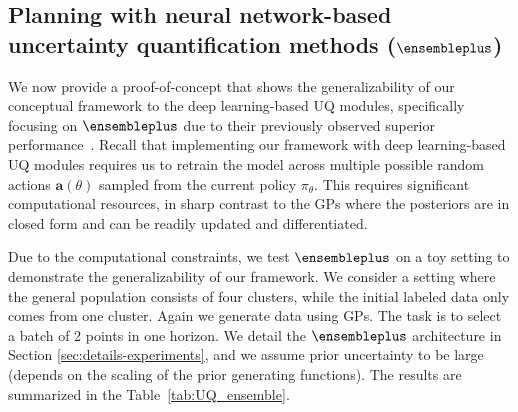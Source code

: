 





\subsection{Planning with  neural network-based uncertainty quantification methods ($\ensembleplus$)}


We now provide a proof-of-concept that shows the generalizability of our conceptual framework  to the deep learning-based UQ modules, specifically focusing on $\ensembleplus$ due to their previously observed superior performance~\citep{OsbandWenAsDwIbLuRo23}. Recall that implementing our framework with deep learning-based UQ modules  requires us to retrain the model across multiple possible random actions $\bm{a}(\theta)$ sampled from the current policy $\pi_\theta$.
This requires significant computational resources, in sharp contrast to the GPs where the posteriors are in closed form and can be readily updated and differentiated. 

Due to the computational constraints, we test $\ensembleplus$ on a toy setting to demonstrate the generalizability of our framework. We consider a setting where the general population consists of four clusters, while the initial labeled data only comes from one cluster. Again we generate data using GPs.  The task is to select a batch of 2 points in one horizon. We detail the $\ensembleplus$ architecture in Section \ref{sec:details-experiments}, and we assume prior uncertainty to be large (depends on the scaling of the prior generating functions). 
The results are summarized in the Table~\ref{tab:UQ_ensemble}.

